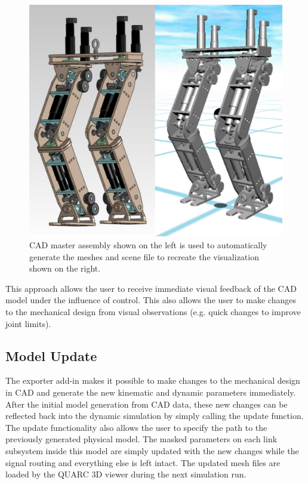 \begin{figure}[!h]
	\centering
    \includegraphics[scale=0.50]{fig/toolchain/masterscene.pdf}
  	\caption{CAD master assembly shown on the left is used to automatically generate the meshes and scene file to recreate the visualization shown on the right.}
	\label{fig:masterscene}
\end{figure}

This approach allows the user to receive immediate visual feedback of the CAD model under the influence of control. This also allows the user to make changes to the mechanical design from visual observations (e.g. quick changes to improve joint limits).

\subsection{Model Update} %
\label{sub:model_update}
The exporter add-in makes it possible to make changes to the mechanical design in CAD and generate the new kinematic and dynamic parameters immediately. After the initial model generation from CAD data, these new changes can be reflected back into the dynamic simulation by simply calling the update function. The update functionality also allows the user to specify the path to the previously generated physical model. The masked parameters on each link subsystem inside this model are simply updated with the new changes while the signal routing and everything else is left intact. The updated mesh files are loaded by the QUARC 3D viewer during the next simulation run.


